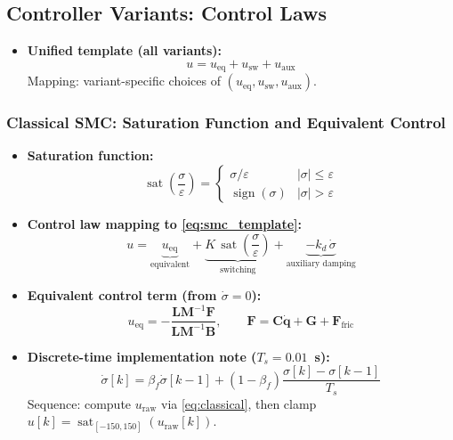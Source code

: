 \documentclass[10pt, a4paper]{article}
\newcommand{\vq}{\boldsymbol{q}}
\newcommand{\sign}{\operatorname{sign}}
\newcommand{\sat}{\operatorname{sat}}
\begin{document}
\subsection{Controller Variants: Control Laws}

\begin{itemize}[leftmargin=1.5em,itemsep=0.2em]
  \item \textbf{Unified template (all variants):}
  \begin{equation}
    u = u_\text{eq} + u_\text{sw} + u_\text{aux}
    \label{eq:smc_template}
  \end{equation}
  Mapping: variant-specific choices of $(u_\text{eq},u_\text{sw},u_\text{aux})$.
\end{itemize}

\subsubsection{Classical SMC: Saturation Function and Equivalent Control}

\begin{itemize}[leftmargin=1.5em,itemsep=0.2em]
  \item \textbf{Saturation function:}
  \begin{equation}
    \sat\!\left(\frac{\sigma}{\varepsilon}\right) =
    \begin{cases}
      \sigma/\varepsilon & |\sigma| \leq \varepsilon \\
      \sign(\sigma)      & |\sigma| > \varepsilon
    \end{cases}
    \label{eq:sat}
  \end{equation}

  \item \textbf{Control law mapping to \eqref{eq:smc_template}:}
  \begin{equation}
    u = \underbrace{u_\text{eq}}_{\text{equivalent}}
      + \underbrace{K\,\sat\!\left(\frac{\sigma}{\varepsilon}\right)}_{\text{switching}}
      + \underbrace{-k_d\,\dot{\sigma}}_{\text{auxiliary damping}}
    \label{eq:classical}
  \end{equation}

  \item \textbf{Equivalent control term (from $\dot{\sigma}=0$):}
  \begin{equation}
    u_\text{eq} = -\frac{\mathbf{L}\mathbf{M}^{-1}\mathbf{F}}
                       {\mathbf{L}\mathbf{M}^{-1}\mathbf{B}},
    \qquad \mathbf{F}=\mathbf{C}\dot{\vq}+\mathbf{G}+\mathbf{F}_\text{fric}
    \label{eq:ueq}
  \end{equation}

  \item \textbf{Discrete-time implementation note ($T_s=0.01$~s):}
  \begin{equation}
    \dot{\sigma}[k] = \beta_f\dot{\sigma}[k-1]
    + (1-\beta_f)\frac{\sigma[k]-\sigma[k-1]}{T_s}
  \end{equation}
  Sequence: compute $u_\text{raw}$ via \eqref{eq:classical}, then clamp
  $u[k]=\sat_{[-150,150]}(u_\text{raw}[k])$.
\end{itemize}
\end{document}
